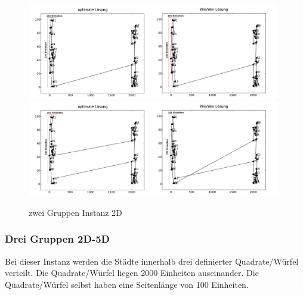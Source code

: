 \documentclass[11pt,a4paper]{article}
\begin{document}
\begin{figure}[H]
    \centering
    \includegraphics[width=11cm]{gfx/crowds2_hpp_comparison}
    \includegraphics[width=11cm]{gfx/crowds2_tsp_comparison}
    \caption{zwei Gruppen Instanz 2D}
    \label{img:crowds2_comparison}
\end{figure}

\subsubsection{Drei Gruppen 2D-5D}
Bei dieser Instanz werden die Städte innerhalb drei definierter Quadrate/Würfel verteilt. Die Quadrate/Würfel liegen 2000 Einheiten auseinander. Die Quadrate/Würfel selbst haben eine Seitenlänge von 100 Einheiten.
\end{document}
